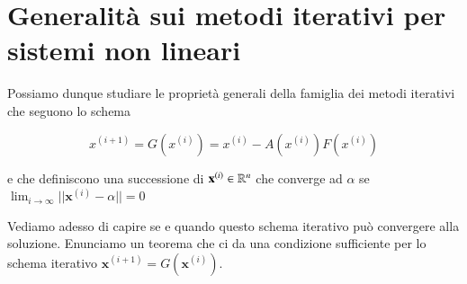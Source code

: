 \section{Generalit\`a sui metodi iterativi per sistemi non lineari}
Possiamo dunque studiare le propriet\`a generali della famiglia dei
metodi iterativi che seguono lo schema

$$ x^{(i+1)} = G(x^{(i)}) = x^{(i)} - A(x^{(i)})F(x^{(i)}) $$

e che definiscono una successione di $ \mathbf{x}^{(i)} \in \mathbb{R}^n $ che
converge ad $ \alpha $ se $ \lim_{i \to \infty} || \mathbf{x}^{(i)}-\alpha
|| = 0 $

Vediamo adesso di capire se e quando questo schema iterativo pu\`o
convergere alla soluzione. Enunciamo un teorema che ci da una
condizione sufficiente per lo schema iterativo $ \mathbf{x}^{(i+1)} =
G(\mathbf{x}^{(i)}) $.


